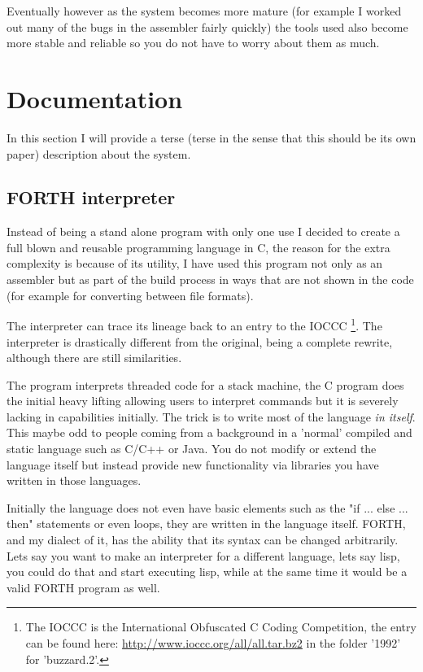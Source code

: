 \documentclass	[a4paper, 10pt]	{article}
\begin{document}
    Eventually however as the system becomes more mature (for example I worked out
    many of the bugs in the assembler fairly quickly) the tools used also become
    more stable and reliable so you do not have to worry about them as much.

  \section{Documentation}

  In this section I will provide a terse (terse in the sense that this should
  be its own paper) description about the system.

    \subsection{FORTH interpreter}

    Instead of being a stand alone program with only one use I decided to create
    a full blown and reusable programming language in C, the reason for the extra
    complexity is because of its utility, I have used this program not only as an
    assembler but as part of the build process in ways that are not shown in the
    code (for example for converting between file formats).

    The interpreter can trace its lineage back to an entry to the IOCCC \footnote{
    The IOCCC is the International Obfuscated C Coding Competition, the entry can
    be found here: \url{http://www.ioccc.org/all/all.tar.bz2} in the folder '1992'
    for 'buzzard.2'.}. The interpreter is drastically different from the original,
    being a complete rewrite, although there are still similarities. 

    The program interprets threaded code \cite{threadedCode} for a stack machine,
    the C program does the initial heavy lifting allowing users to interpret commands
    but it is severely lacking in capabilities initially. The trick is to write most
    of the language \emph{in itself}. This maybe odd to people coming from a background
    in a 'normal' compiled and static language such as C/C++ or Java. You do not modify or extend
    the language itself but instead provide new functionality via libraries you have
    written in those languages.

    Initially the language does not even have basic elements such as the "if ... else ... then"
    statements or even loops, they are written in the language itself. FORTH, and my
    dialect of it, has the ability that its syntax can be changed arbitrarily. Lets say
    you want to make an interpreter for a different language, lets say lisp, you could
    do that and start executing lisp, while at the same time it would be a valid FORTH
    program as well.
\end{document}
